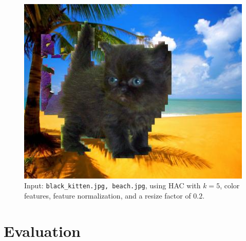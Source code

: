 \documentclass[12pt]{article}
\begin{document}
\begin{figure}[H]
	\centering
	\includegraphics[width=.5\textwidth]{grabcat2.jpg}
	\caption{Input: \texttt{black\_kitten.jpg, beach.jpg}, using HAC with $k = 5$, color features, feature normalization, and a resize factor of $0.2$.}
\end{figure}

\section{Evaluation}
\end{document}

